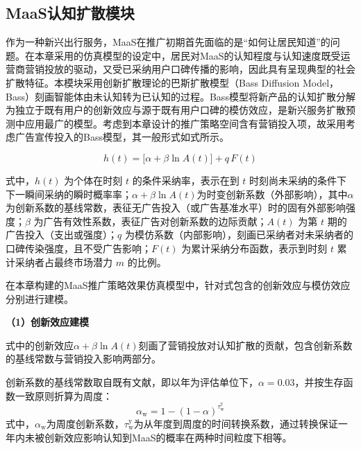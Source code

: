 \subsection{MaaS认知扩散模块}\label{subsec.opt.abm.diffusion}

作为一种新兴出行服务，MaaS在推广初期首先面临的是``如何让居民知道''的问题。在本章采用的仿真模型的设定中，居民对MaaS的认知程度与认知速度既受运营商营销投放的驱动，又受已采纳用户口碑传播的影响，因此具有呈现典型的社会扩散特征。本模块采用创新扩散理论的巴斯扩散模型（Bass Diffusion Model，Bass）刻画智能体由未认知转为已认知的过程\citep{bassNewProductGrowth1969}。Bass模型将新产品的认知扩散分解为独立于既有用户的创新效应与源于既有用户口碑的模仿效应，是新兴服务扩散预测中应用最广的模型。考虑到本章设计的推广策略空间含有营销投入项，故采用考虑广告宣传投入的Bass模型\cite{horskyAdvertisingDiffusionNew1983}，其一般形式如式所示。

\begin{equation}
  h(t) = \big[\alpha + \beta \ln A(t)\big]
       + q\,F(t)
  \label{eq.opt.bass}
\end{equation}

\noindent 式中，$h(t)$ 为个体在时刻 $t$ 的条件采纳率，表示在到 $t$ 时刻尚未采纳的条件下下一瞬间采纳的瞬时概率率；$\alpha+\beta\ln A(t)$为时变创新系数（外部影响），其中$\alpha$ 为创新系数的基线常数，表征无广告投入（或广告基准水平）时的固有外部影响强度；$\beta$ 为广告有效性系数，表征广告对创新系数的边际贡献；$A(t)$ 为第 $t$ 期的广告投入（支出或强度）；$q$ 为模仿系数（内部影响），刻画已采纳者对未采纳者的口碑传染强度，且不受广告影响；$F(t)$ 为累计采纳分布函数，表示到时刻 $t$ 累计采纳者占最终市场潜力 $m$ 的比例。

在本章构建的MaaS推广策略效果仿真模型中，针对式包含的创新效应与模仿效应分别进行建模。

\textbf{（1）创新效应建模}

式中的创新效应$\alpha+\beta\ln A(t)$刻画了营销投放对认知扩散的贡献，包含创新系数的基线常数与营销投入影响两部分。

创新系数的基线常数取自既有文献，即以年为评估单位下，$\alpha=0.03$\citep{sultanMetaanalysisApplicationsDiffusion1990}，并按生存函数一致原则折算为周度：
\begin{equation}
\alpha_{\mathrm{w}} = 1-(1-\alpha)^{\tau^{\mathrm{y}} _{\mathrm{w}}}
\label{eq.opt.bassweekly1}
\end{equation}
式中，$\alpha_{\mathrm{w}}$为周度创新系数，$\tau^{\mathrm{y}} _{\mathrm{w}}$为从年度到周度的时间转换系数，通过转换保证一年内未被创新效应影响认知到MaaS的概率在两种时间粒度下相等。

